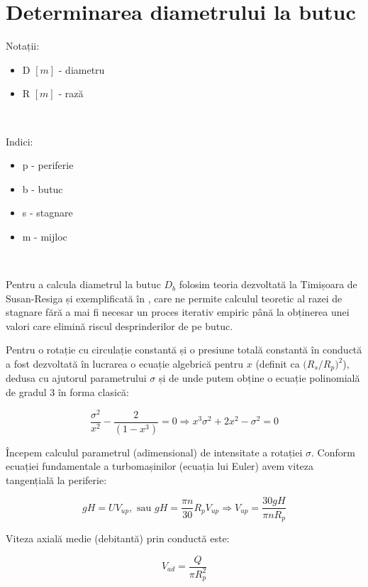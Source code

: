 \chapter{Determinarea diametrului la butuc}\label{chapter:butuc}

Notații:
\begin{itemize}
    \item D $[m]$ - diametru
    \item R $[m]$ - rază
\end{itemize}

\

\noindent
Indici:
\begin{itemize}
    \item p - periferie
    \item b - butuc
    \item s - stagnare
    \item m - mijloc
\end{itemize}

\

Pentru a calcula diametrul la butuc $D_b$ folosim teoria dezvoltată la Timișoara de Susan-Resiga și exemplificată în \cite{susanhub}, care ne permite calculul teoretic al razei de stagnare fără a mai fi necesar un proces iterativ empiric până la obținerea unei valori care elimină riscul desprinderilor de pe butuc.

Pentru o rotație cu circulație constantă și o presiune totală constantă în conductă a fost dezvoltată în lucrarea \cite{susanhub} o ecuație algebrică pentru $x$ (definit ca $\big(R_s/R_p\big)^2$), dedusa cu ajutorul parametrului $\sigma$ și de unde putem obține o ecuație polinomială de gradul 3 în forma clasică:

\begin{equation}
\frac{\sigma^2}{x^2} - \frac{2}{(1-x^3)} = 0 \Rightarrow x^3 \sigma^2 + 2x^2 - \sigma^2 = 0
\end{equation}

Începem calculul parametrul (adimensional) de intensitate a rotației $\sigma$. Conform ecuației fundamentale a turbomașinilor (ecuația lui Euler) avem viteza tangențială la periferie:

\begin{equation}
gH=UV_{up}, \text{ sau } gH=\frac{\pi n}{30} R_{p} V_{up} \Rightarrow V_{up}=\frac{30gH}{\pi n R_{p}}
\end{equation}

Viteza axială medie (debitantă) prin conductă este:

\begin{equation}
V_{ad}=\frac{Q}{\pi R_{p}^2}
\end{equation}

